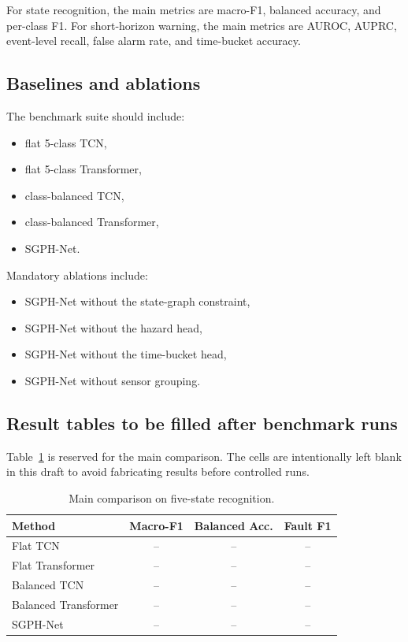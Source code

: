 For state recognition, the main metrics are macro-F1, balanced accuracy, and per-class F1. For short-horizon warning, the main metrics are AUROC, AUPRC, event-level recall, false alarm rate, and time-bucket accuracy.

\subsection{Baselines and ablations}

The benchmark suite should include:
\begin{itemize}
\item flat 5-class TCN,
\item flat 5-class Transformer,
\item class-balanced TCN,
\item class-balanced Transformer,
\item SGPH-Net.
\end{itemize}

Mandatory ablations include:
\begin{itemize}
\item SGPH-Net without the state-graph constraint,
\item SGPH-Net without the hazard head,
\item SGPH-Net without the time-bucket head,
\item SGPH-Net without sensor grouping.
\end{itemize}

\subsection{Result tables to be filled after benchmark runs}

Table~\ref{tab:main_results} is reserved for the main comparison. The cells are intentionally left blank in this draft to avoid fabricating results before controlled runs.

\begin{table}[t]
\centering
\caption{Main comparison on five-state recognition.}
\label{tab:main_results}
\begin{tabular}{lccc}
\toprule
Method & Macro-F1 & Balanced Acc. & Fault F1 \\
\midrule
Flat TCN & -- & -- & -- \\
Flat Transformer & -- & -- & -- \\
Balanced TCN & -- & -- & -- \\
Balanced Transformer & -- & -- & -- \\
SGPH-Net & -- & -- & -- \\
\bottomrule
\end{tabular}
\end{table}

